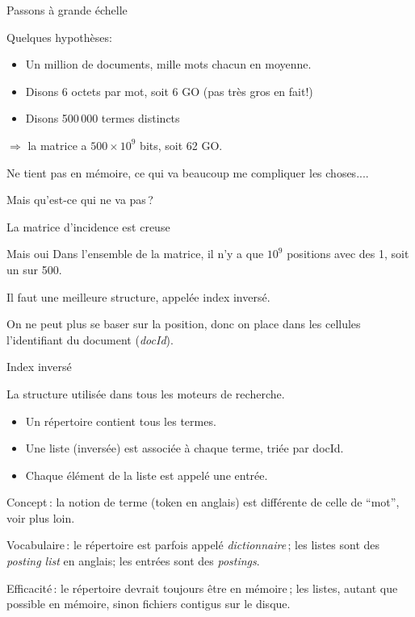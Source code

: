 \begin{frame}{Passons à grande échelle}

Quelques hypothèses:
\begin{itemize}
 \item Un million de documents, mille mots chacun en moyenne.
 \item Disons 6 octets par mot, soit 6 GO (pas très gros en fait!)
 \item Disons 500\,000 termes \alert{distincts}
\end{itemize}

$\Rightarrow$ la matrice a $500 \times 10^9$ bits, soit 62 GO.

\vfill

Ne tient pas en mémoire, ce qui va beaucoup me compliquer les choses....

\vfill

\alert{Mais qu'est-ce qui ne va pas\,?}

\end{frame}


\begin{frame}{La matrice d'incidence est \alert{creuse}}

\begin{block}{Mais oui}
Dans l'ensemble de la matrice, il n'y a que $10^9$ positions avec des 1, soit un sur 500.
\end{block}

Il faut une meilleure structure, appelée \alert{index inversé}.


On ne peut plus se baser sur la \alert{position}, donc on place dans les cellules \alert{l'identifiant}
du document (\textit{docId}).

\end{frame}

\begin{frame}{Index inversé}

La structure utilisée dans \alert{tous}  les moteurs de recherche.

\begin{itemize}
 \item Un \alert{répertoire} contient tous les \alert{termes}.
 \item Une \alert{liste} (inversée) est associée à chaque \alert{terme}, \alert{triée} par docId.
 \item  Chaque élément de la liste est appelé une \alert{entrée}.
\end{itemize}

\vfill

\alert{Concept}\,: la notion de \alert{terme} (\alert{token} en anglais) est différente de celle de ``mot'', voir plus loin.
\vfill

\alert{Vocabulaire}\,: le répertoire est parfois appelé \emph{dictionnaire}\,; les listes sont des \emph{posting list} en anglais;
les entrées sont des \emph{postings}.

\vfill

\alert{Efficacité}\,: le répertoire devrait toujours être en mémoire\,; les listes, autant que possible en mémoire, sinon
fichiers contigus sur le disque.
\end{frame}

